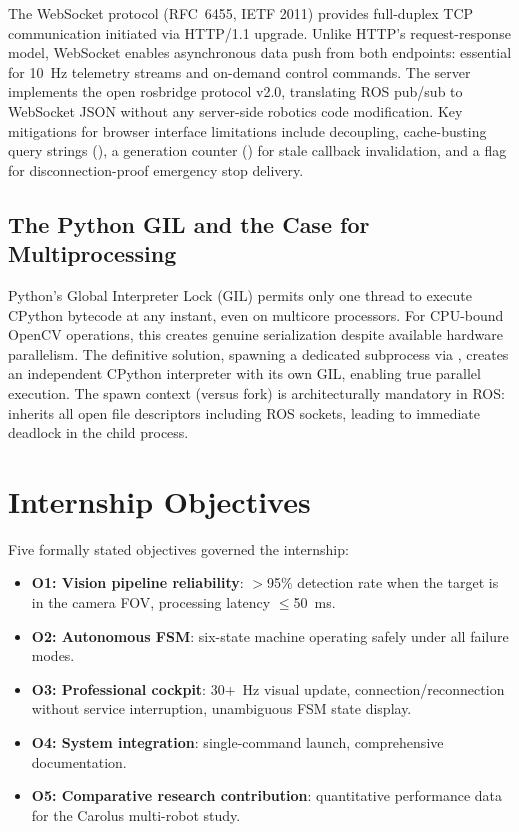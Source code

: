 The WebSocket protocol (RFC~6455, IETF 2011) provides full-duplex TCP communication initiated via HTTP/1.1 upgrade. Unlike HTTP's request-response model, WebSocket enables asynchronous data push from both endpoints: essential for 10~Hz telemetry streams and on-demand control commands. The  server implements the open rosbridge protocol v2.0, translating ROS pub/sub to WebSocket JSON without any server-side robotics code modification. Key mitigations for browser interface limitations include  decoupling, cache-busting query strings (), a generation counter () for stale callback invalidation, and a  flag for disconnection-proof emergency stop delivery.

\subsection{The Python GIL and the Case for Multiprocessing}
\label{sec:visionarch}

Python's Global Interpreter Lock (GIL) permits only one thread to execute CPython bytecode at any instant, even on multicore processors. For CPU-bound OpenCV operations, this creates genuine serialization despite available hardware parallelism. The definitive solution, spawning a dedicated subprocess via , creates an independent CPython interpreter with its own GIL, enabling true parallel execution. The spawn context (versus fork) is architecturally mandatory in ROS:  inherits all open file descriptors including ROS sockets, leading to immediate deadlock in the child process.

\section{Internship Objectives}

Five formally stated objectives governed the internship:

\begin{itemize}[leftmargin=1.4em]
  \item \textbf{O1: Vision pipeline reliability}: $>$95\% detection rate when the target is in the camera FOV, processing latency $\leq$50~ms.
  \item \textbf{O2: Autonomous FSM}: six-state machine operating safely under all failure modes.
  \item \textbf{O3: Professional cockpit}: 30+~Hz visual update, connection/reconnection without service interruption, unambiguous FSM state display.
  \item \textbf{O4: System integration}: single-command launch, comprehensive documentation.
  \item \textbf{O5: Comparative research contribution}: quantitative performance data for the Carolus multi-robot study.
\end{itemize}

